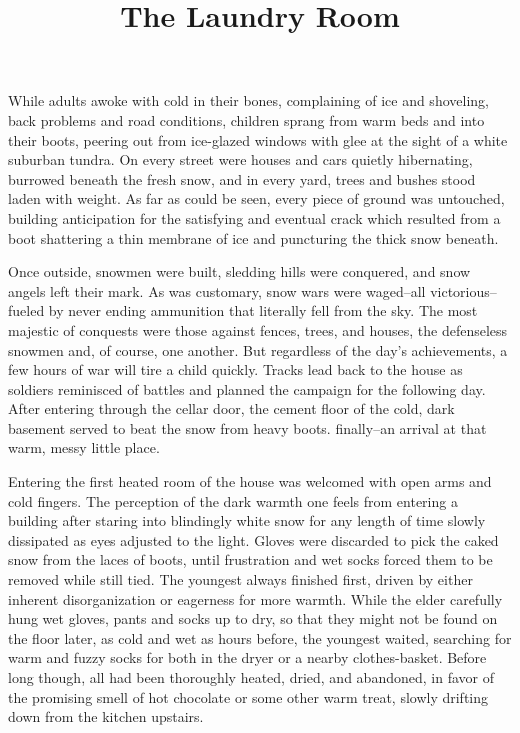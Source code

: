 \documentclass[letterpaper]{article}
\title{The Laundry Room}
\date{}
\begin{document}
	\maketitle
	\thispagestyle{empty}
	\onehalfspacing
While adults awoke with cold in their bones, complaining of ice and shoveling, back problems and road conditions, children sprang from warm beds and into their boots, peering out from ice-glazed windows with glee at the sight of a white suburban tundra. On every street were houses and cars quietly hibernating, burrowed beneath the fresh snow, and in every yard, trees and bushes stood laden with weight. As far as could be seen, every piece of ground was untouched, building anticipation for the satisfying and eventual crack which resulted from a boot shattering a thin membrane of ice and puncturing the thick snow beneath.

Once outside, snowmen were built, sledding hills were conquered, and snow angels left their mark. As was customary, snow wars were waged--all victorious--fueled by never ending ammunition that literally fell from the sky. The most majestic of conquests were those against fences, trees, and houses, the defenseless snowmen and, of course, one another. But regardless of the day’s achievements, a few hours of war will tire a child quickly. Tracks lead back to the house as soldiers reminisced of battles and planned the campaign for the following day. After entering through the cellar door, the cement floor of the cold, dark basement served to beat the snow from heavy boots. finally--an arrival at that warm, messy little place.

Entering the first heated room of the house was welcomed with open arms and cold fingers. The perception of the dark warmth one feels from entering a building after staring into blindingly white snow for any length of time slowly dissipated as eyes adjusted to the light. Gloves were discarded to pick the caked snow from the laces of boots, until frustration and wet socks forced them to be removed while still tied. The youngest always finished first, driven by either inherent disorganization or eagerness for more warmth. While the elder carefully hung wet gloves, pants and socks up to dry, so that they might not be found on the floor later, as cold and wet as hours before, the youngest waited, searching for warm and fuzzy socks for both in the dryer or a nearby clothes-basket. Before long though, all had been thoroughly heated, dried, and abandoned, in favor of the promising smell of hot chocolate or some other warm treat, slowly drifting down from the kitchen upstairs.
\end{document}
